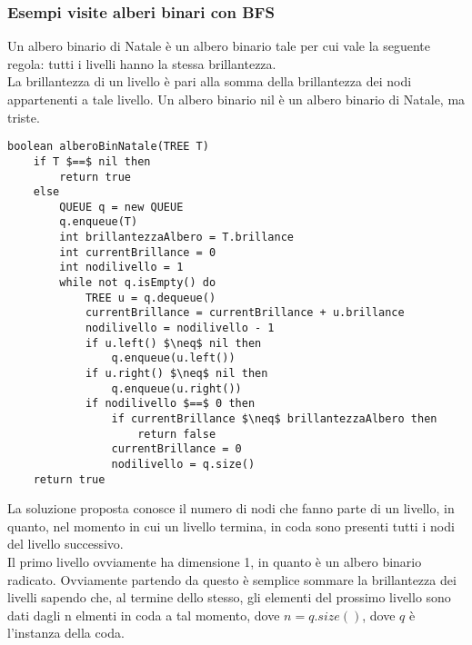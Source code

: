\documentclass[../cheatSheetAlgoritmi.tex]{subfiles}
\begin{document}
\subsubsection{Esempi visite alberi binari con BFS}
Un albero binario di Natale è un albero binario tale per cui vale la seguente regola: tutti i livelli hanno la stessa brillantezza.  \\La brillantezza di un livello è pari alla somma della brillantezza dei nodi appartenenti a tale livello.  Un albero binario nil è un albero binario di Natale, ma triste.
\begin{lstlisting}[caption=Esempi BFS alberi binari]
boolean alberoBinNatale(TREE T)
	if T $==$ nil then
		return true
	else
		QUEUE q = new QUEUE
		q.enqueue(T)
		int brillantezzaAlbero = T.brillance
		int currentBrillance = 0
		int nodilivello = 1
		while not q.isEmpty() do
			TREE u = q.dequeue()
			currentBrillance = currentBrillance + u.brillance
			nodilivello = nodilivello - 1
			if u.left() $\neq$ nil then
				q.enqueue(u.left())
			if u.right() $\neq$ nil then
				q.enqueue(u.right())
			if nodilivello $==$ 0 then
				if currentBrillance $\neq$ brillantezzaAlbero then
					return false
				currentBrillance = 0
				nodilivello = q.size()
	return true
\end{lstlisting}
\newpage
\begin{flushleft}
La soluzione proposta conosce il numero di nodi che fanno parte di un livello, in quanto, nel momento in cui un livello termina, in coda sono presenti tutti i nodi del livello successivo. \\
Il primo livello ovviamente ha dimensione 1, in quanto è un albero binario radicato. Ovviamente partendo da questo è semplice sommare la brillantezza dei livelli sapendo che, al termine dello stesso, gli elementi del prossimo livello sono dati dagli n elmenti in coda a tal momento, dove $n = q.size()$, dove $q$ è l'instanza della coda.
\end{flushleft}
\end{document}
